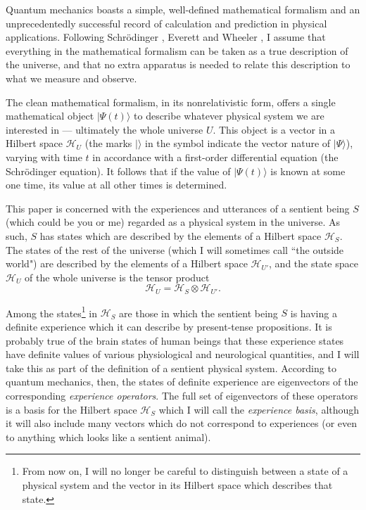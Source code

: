\documentclass[12pt,reqno]{article}
\renewcommand{\(}{\left(}
\renewcommand{\)}{\right)}
\renewcommand{\H}{\mathcal{H}}
\newcommand{\<}{\langle}
\renewcommand{\>}{\rangle}
\theoremstyle{plain} %
\begin{document}
Quantum mechanics boasts a simple, well-defined mathematical formalism and an unprecedentedly successful record of calculation and prediction in physical applications. Following Schr\"odinger \cite{Schrodinger:interpretns}, Everett \cite{Everett} and Wheeler \cite{Wheeler}, I assume that everything in the mathematical formalism can be taken as a true description of the universe, and that no extra apparatus is needed to relate this description to what we measure and observe.

The clean mathematical formalism, in its nonrelativistic form, offers a single mathematical object $|\Psi(t)\>$ to describe whatever physical system we are interested in --- ultimately the whole universe $U$. This object is a vector in a Hilbert space $\H_U$ (the marks $|\>$ in the symbol indicate the vector nature of $|\Psi\>$), varying with time $t$ in accordance with a first-order differential equation (the Schr\"odinger equation). It follows that if the value of $|\Psi(t)\>$ is known at some one time, its value at all other times is determined.

This paper is concerned with the experiences and utterances of a sentient being $S$ (which could be you or me) regarded as a physical system in the universe. As such, $S$ has states which are described by the elements of a Hilbert space $\H_S$. The states of the rest of the universe (which I will sometimes call ``the outside world") are described by the elements of a Hilbert space $\H_{U'}$, and the state space $\H_U$ of the whole universe is the tensor product
\[
\H_U = \H_S \otimes \H_{U'}.
\]

Among the states\footnote{From now on, I will no longer be careful to distinguish between a state of a physical system and the vector in its Hilbert space which describes that state.}  in $\H_S$ are those in which the sentient being $S$ is having a definite experience which it can describe by present-tense propositions. It is probably true \cite{Tegmark} of the brain states of human beings that these experience states have definite values of various physiological and neurological quantities, and I will take this as part of the definition of a sentient physical system. According to quantum mechanics, then, the states of definite experience are eigenvectors of the corresponding \emph{experience operators}. The full set of eigenvectors of these operators is a basis for the Hilbert space $\H_S$ which I will call the \emph{experience basis}, although it will also include many vectors which do not correspond to experiences (or even to anything which looks like a sentient animal).
\end{document}
